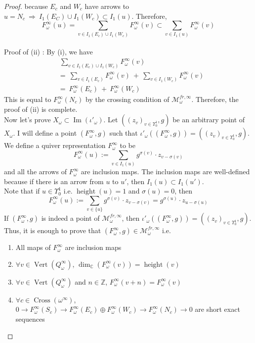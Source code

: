 \begin{proof}
because $E_c$ and $W_c$ have arrows to $u=N_c~\Rightarrow~I_1(E_C)\cup I_1(W_c)\subset I_1(u)$. Therefore,
\[
F_\omega^\infty(u) = \sum_{v\in I_1(E_c)\cup I_1(W_c)} F_\omega^\infty(v)\subset \sum_{v\in I_1(u)} F_\omega^\infty(v)
\]\\
Proof of (\Rn{2}) : By (\Rn{1}), we have
\begin{align*}
&~\sum_{v\in I_1(E_c)\cup I_1(W_c)} F_\omega^\infty(v) \\
&=~\sum_{v\in I_1(E_c)} F_\omega^\infty(v)~+~\sum_{v\in I_1(W_c)} F_\omega^\infty(v)\\
&=~F_\omega^\infty(E_c)~+~F_\omega^\infty(W_c)
\end{align*}
This is equal to $F_\omega^\infty(N_c)$ by the crossing condition of $\mathcal{M}_\omega^{fr,\infty}$. Therefore, the proof of (\Rn{2}) is complete.\\
Now let's prove $X_\omega \subset \operatorname{Im}(\iota'_\omega)$. Let $((z_v)_{v\in \Upsilon_0^1},g)$ be an arbitrary point of $X_\omega$. I will define a point $(F_\omega^\infty,g)$ such that $\iota'_\omega((F_\omega^\infty,g))=((z_v)_{v\in \Upsilon_0^1},g)$. We define a quiver representation $F_\omega^\infty$ to be 
\[
F_\omega^\infty(u):=\sum_{v\in I_1(u)}g^{\sigma(v)}\cdot z_{v-\sigma(v)}
\]
and all the arrows of $F_\omega^\infty$ are inclusion maps. The inclusion maps are well-defined because if there is an arrow from $u$ to $u'$, then $I_1(u)\subset I_1(u')$.\\
Note that if $u\in\Upsilon_0^1$ i.e. $\operatorname{height}(u)=1$ and $\sigma(u) = 0$, then 
\[
F_\omega^\infty(u):=\sum_{v\in \{u\}}g^{\sigma(v)}\cdot z_{v-\sigma(v)} = g^{\sigma(u)}\cdot z_{u-\sigma(u)} 
\]
If $(F_\omega^\infty ,g)$ is indeed a point of $\mathcal{M}_\omega^{fr,\infty}$, then $\iota'_\omega ((F_\omega^\infty,g)) = ((z_v)_{v\in\Upsilon_0^1},g)$. Thus, it is enough to prove that $(F_\omega^\infty,g)\in\mathcal{M}_\omega^{fr,\infty}$ i.e.
\begin{enumerate}[label = (\roman*)]
\item All maps of $F_\omega^\infty$ are inclusion maps
\item $\forall v\in \operatorname{Vert}(Q_\omega^\infty)$, $\operatorname{dim}_\mathbb{C}(F_\omega^\infty(v)) = \operatorname{height}(v)$
\item $\forall v\in \operatorname{Vert}(Q_\omega^\infty)$ and $n\in \mathbb{Z}$, $F_\omega^\infty(v+n) = F_\omega^\infty(v)$
\item $\forall c\in \operatorname{Cross}(\omega^\infty)$, $0\rightarrow F_\omega^\infty(S_c)\rightarrow F_\omega^\infty(E_c)\oplus F_\omega^\infty(W_c)\rightarrow F_\omega^\infty(N_c)\rightarrow 0$ are short exact sequences

\end{enumerate}
\end{proof}
